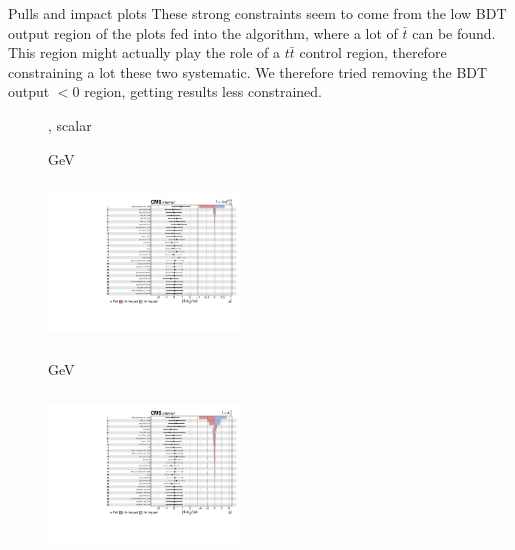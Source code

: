 \documentclass[8pt]{beamer}
\begin{document}
\begin{frame}{Pulls and impact plots}
\justifying
These strong constraints seem to come from the low BDT output region of the plots fed into the algorithm, where a lot of $ \bar t$ can be found. This region might actually play the role of a $t \bar t$ control region, therefore constraining a lot these two systematic. \vfill
We therefore tried removing the BDT output $< 0$ region, getting results less constrained. \vfill

\begin{figure}[htbp]
\centering
\begin{block}{, scalar}\end{block}	\vspace{-8pt}

\begin{minipage}[b]{0.49\textwidth}
\begin{center}
\centering \begin{block}{ GeV}\end{block}	
\includegraphics[width=5.1cm, height=4.2cm]{figs/impacts_fixed/impacts_2018_both_scalar_100.pdf}
\end{center}
\end{minipage}\hfill
\begin{minipage}[b]{0.49\textwidth}
\begin{center}
\centering \begin{block}{ GeV}\end{block}	
\includegraphics[width=5.1cm, height=4.2cm]{figs/impacts_fixed/impacts_2018_both_scalar_500.pdf}
\end{center}
\end{minipage} \hfill
\end{figure} \vfill
\end{frame}
\end{document}
